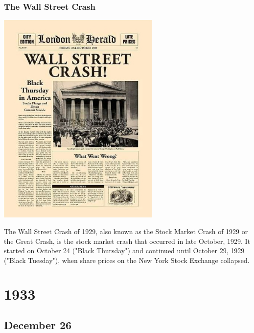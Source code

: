 \documentclass[11pt]{report}
\begin{document}
\subsection{The Wall Street Crash}
\vspace{2mm}\begin{center}\includegraphics[width=8cm]{./img/wallStreetCrash.jpg}\end{center}
The Wall Street Crash of 1929, also known as the Stock Market Crash of 1929 or the Great Crash, is the stock market crash that occurred in late October, 1929. It started on October 24 ("Black Thursday") and continued until October 29, 1929 ("Black Tuesday"), when share prices on the New York Stock Exchange collapsed.

\chapter{1933}
\section{December 26}
\end{document}

